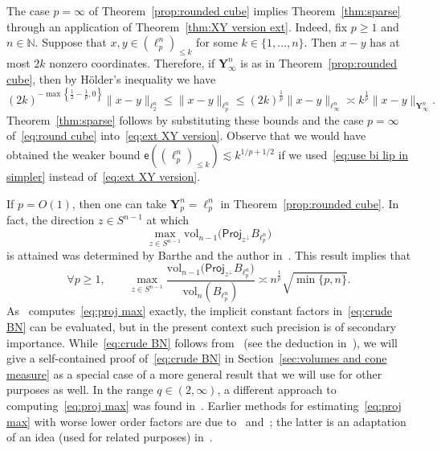 \documentclass[11pt,reqno]{amsart}
\renewcommand{\le}{\leqslant}
\renewcommand{\ge}{\geqslant}
\newcommand{\proj}{\mathsf{Proj}}
\newcommand{\n}{\{1,\ldots,n\}}
\newcommand{\Y}{\mathbf Y}
\theoremstyle{remark}
\newcommand{\N}{\mathbb N}
\newcommand{\ee}{\mathsf{e}}
\newcommand{\vol}{\mathrm{vol}}
\renewcommand{\1}{\mathbf 1}
\begin{document}
The case $p=\infty$ of Theorem~\ref{prop:rounded cube} implies Theorem~\ref{thm:sparse} through an application of Theorem~\ref{thm:XY version ext}. Indeed, fix $p\ge 1$ and $n\in \N$. Suppose that $x,y\in (\ell_p^n)_{\le k}$ for some $k\in \n$. Then $x-y$ has at most $2k$ nonzero coordinates. Therefore, if $\Y_\infty^n$ is as in Theorem~\ref{prop:rounded cube}, then by H\"older's inequality we have
\begin{equation}\label{eq:holder on small supprt}
(2k)^{-\max\left\{\frac12-\frac{1}{p},0\right\}}\|x-y\|_{\ell_2^n}\le \|x-y\|_{\ell_p^n}\le (2k)^{\frac{1}{p}} \|x-y\|_{\ell_\infty^n}\asymp k^{\frac{1}{p}} \|x-y\|_{\Y_\infty^n}.
\end{equation}
Theorem~\ref{thm:sparse} follows by substituting these bounds and the case $p=\infty$ of~\eqref{eq:round cube} into~\eqref{eq:ext XY version}. Observe that we would have obtained the weaker bound $\ee((\ell_p^n)_{\le k})\lesssim k^{1/p+1/2}$ if we used~\eqref{eq:use bi lip in simpler} instead of~\eqref{eq:ext XY version}.




If $p=O(1)$, then one can take $\Y_p^n=\ell_p^n$ in Theorem~\ref{prop:rounded cube}.  In fact, the direction $z\in S^{n-1}$ at which
\begin{equation}\label{eq:proj max}
\max_{z\in S^{n-1}} \vol_{n-1}\big(\proj_{z^{\perp}}B_{\ell_p^n}\big)
\end{equation}
is attained was determined by Barthe and the author in~\cite{BN02}. This result implies that
\begin{equation}\label{eq:crude BN}
\forall p\ge 1,\qquad \max_{z\in S^{n-1}}\frac{\vol_{n-1}\big(\proj_{z^\perp}B_{\ell_p^n}\big)}{\vol_n(B_{\ell_p^n})}\asymp n^{\frac{1}{p}} \sqrt{\min\{p,n\}}.
\end{equation}
As~\cite{BN02} computes~\eqref{eq:proj max} exactly,  the implicit constant factors in~\eqref{eq:crude BN} can be evaluated, but in the present context such  precision is of secondary importance. While~\eqref{eq:crude BN} follows from~\cite{BN02} (see the deduction in~\cite{Nao17-SODA}), we will give a self-contained proof  of~\eqref{eq:crude BN} in Section~\ref{sec:volumes and cone measure} as a special case of a more general result that we will use for other purposes as well. In the range $q\in (2,\infty)$, a different approach to computing~\eqref{eq:proj max} was found in~\cite{KRZ04}. Earlier methods for estimating~\eqref{eq:proj max} with worse lower order  factors are due to~\cite{Sch89} and~\cite{Mul90}; the latter is an adaptation of an idea (used for related purposes) in~\cite{Bou87-maximal}.
\end{document}
